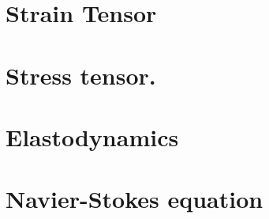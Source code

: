    


   \chapter{Strain Tensor}
      
      
      
      
      
      
   \chapter{Stress tensor.}
      
      
      
      
      
      
      
      

   \chapter{Elastodynamics}
      
      
      
      
      

   \chapter{Navier-Stokes equation}
      
      
      
      
      

